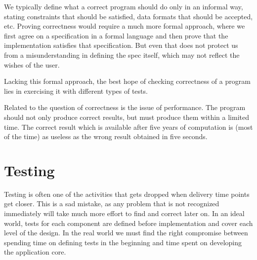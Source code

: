 \documentclass[a4paper,12pt]{report}
\begin{document}
We typically define what a correct program should do only in an informal way, stating constraints that should be satisfied, data formats that should be accepted, etc. Proving correctness would require a much more formal approach, where we first agree on a specification in a formal language and then prove that the implementation satisfies that specification. But even that does not protect us from a misunderstanding in defining the spec itself, which may not reflect the wishes of the user.

Lacking this formal approach, the best hope of checking correctness of a program lies in exercising it with different types of tests.

Related to the question of correctness is the issue of performance. The program should not only produce correct results, but must produce them within a limited time. The correct result which is available after five years of computation is (most of the time) as useless as the wrong result obtained in five seconds.

\section{Testing}
Testing is often one of the activities that gets dropped when delivery time points get closer. This is a sad mistake, as any problem that is not recognized immediately will take much more effort to find and correct later on. In an ideal world, tests for each component are defined before implementation and cover each level of the design. In the real world we must find the right compromise between spending time on defining tests in the beginning and time spent on developing the application core.
\end{document}

